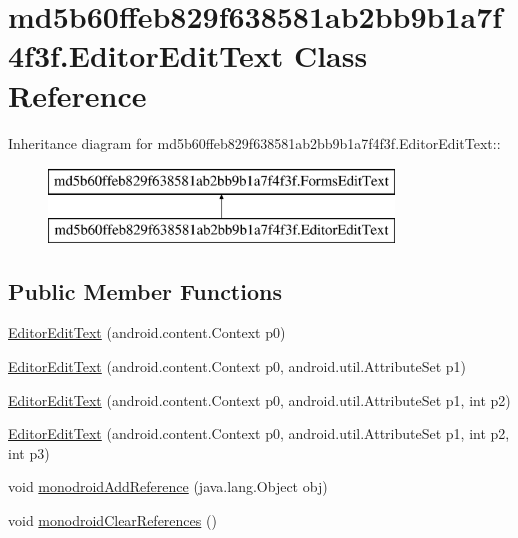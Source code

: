\hypertarget{classmd5b60ffeb829f638581ab2bb9b1a7f4f3f_1_1_editor_edit_text}{
\section{md5b60ffeb829f638581ab2bb9b1a7f4f3f.EditorEditText Class Reference}
\label{classmd5b60ffeb829f638581ab2bb9b1a7f4f3f_1_1_editor_edit_text}
}
Inheritance diagram for md5b60ffeb829f638581ab2bb9b1a7f4f3f.EditorEditText::\begin{figure}[H]
\begin{center}
\leavevmode
\includegraphics[height=2cm]{classmd5b60ffeb829f638581ab2bb9b1a7f4f3f_1_1_editor_edit_text}
\end{center}
\end{figure}
\subsection*{Public Member Functions}
\begin{CompactItemize}
\item 
\hyperlink{classmd5b60ffeb829f638581ab2bb9b1a7f4f3f_1_1_editor_edit_text_f867d7b8157b5de4238185bf6f6676bf}{EditorEditText} (android.content.Context p0)
\item 
\hyperlink{classmd5b60ffeb829f638581ab2bb9b1a7f4f3f_1_1_editor_edit_text_cecda8e695b3aabe8c8cf239e9a086c4}{EditorEditText} (android.content.Context p0, android.util.AttributeSet p1)
\item 
\hyperlink{classmd5b60ffeb829f638581ab2bb9b1a7f4f3f_1_1_editor_edit_text_0f6e1c351c540635b51c75ed5cc7ef59}{EditorEditText} (android.content.Context p0, android.util.AttributeSet p1, int p2)
\item 
\hyperlink{classmd5b60ffeb829f638581ab2bb9b1a7f4f3f_1_1_editor_edit_text_a96dd97388dccea5ef79dc06281b4d07}{EditorEditText} (android.content.Context p0, android.util.AttributeSet p1, int p2, int p3)
\item 
void \hyperlink{classmd5b60ffeb829f638581ab2bb9b1a7f4f3f_1_1_editor_edit_text_2d346ebbcec03d19cb05949a57c42ca2}{monodroidAddReference} (java.lang.Object obj)
\item 
void \hyperlink{classmd5b60ffeb829f638581ab2bb9b1a7f4f3f_1_1_editor_edit_text_acf56440a58971488b7292ee85983d77}{monodroidClearReferences} ()
\end{CompactItemize}
